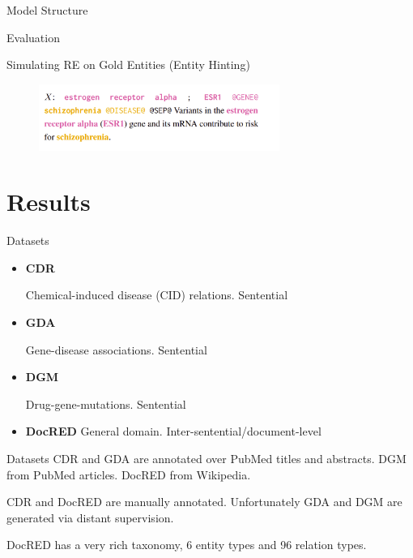 \documentclass[usenames,dvipsnames,pdf]{beamer}
\begin{document}
        \begin{frame}{Model Structure}
          
        \end{frame}

        \begin{frame}{Evaluation}
          
        \end{frame}

        \begin{frame}{Simulating RE on Gold Entities (Entity Hinting)}
          \begin{figure}
            \includegraphics[width=0.7\textwidth,height=0.7\textheight,keepaspectratio]{entity_hint} 
          \end{figure}
        \end{frame}
        
        \section{Results}

        \begin{frame}{Datasets}
          \begin{itemize}
          \item \textbf{CDR}


            Chemical-induced disease (CID) relations.  Sentential 
          \item \textbf{GDA}


            Gene-disease associations.  Sentential    
          \item \textbf{DGM}

            Drug-gene-mutations.  Sentential
          \item \textbf{DocRED}
            General domain.  Inter-sentential/document-level
            
          \end{itemize}
        \end{frame}

        \begin{frame}{Datasets}
          CDR and GDA are annotated over PubMed titles and abstracts.
          DGM from PubMed articles.
          DocRED from Wikipedia. \hfill \break \hfill \break
          
          
          CDR and DocRED are manually annotated.
          Unfortunately GDA and DGM are generated via distant supervision.\hfill \break \hfill \break

        
          
          DocRED has a very rich taxonomy, 6 entity types and 96 relation types.
        \end{frame}
\end{document}
